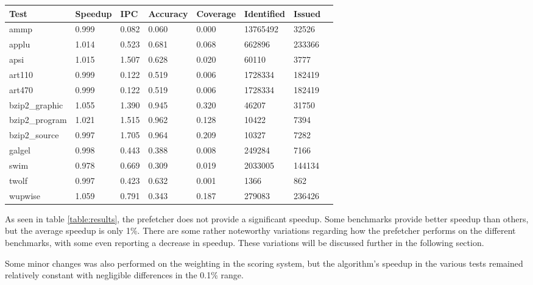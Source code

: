 

\begin{table*}[!t]
\renewcommand{\arraystretch}{1.3}
\caption{Prefetcher results from the Kongull Cluster}
\label{table:results}
\centering
\begin{tabular}{|l|l|l|l|l|l|l|l|}
\hline
\bfseries Test & \bfseries Speedup & \bfseries IPC & \bfseries Accuracy & \bfseries Coverage & \bfseries Identified & \bfseries Issued\\
\hline
\hline
ammp 		& 0.999 & 0.082 & 0.060 & 0.000 & 13765492 & 32526\\
applu 		& 1.014 & 0.523 & 0.681 & 0.068 & 662896   & 233366\\
apsi 		& 1.015 & 1.507 & 0.628 & 0.020 & 60110    & 3777\\	
art110 		& 0.999 & 0.122 & 0.519 & 0.006 & 1728334  & 182419\\	
art470 		& 0.999 & 0.122 & 0.519 & 0.006 & 1728334  & 182419\\
bzip2\_graphic 	& 1.055 & 1.390 & 0.945 & 0.320 & 46207    & 31750\\
bzip2\_program 	& 1.021 & 1.515 & 0.962 & 0.128 & 10422    & 7394\\
bzip2\_source 	& 0.997 & 1.705 & 0.964 & 0.209 & 10327    & 7282\\
galgel 		& 0.998 & 0.443 & 0.388 & 0.008 & 249284   & 7166\\
swim 		& 0.978 & 0.669 & 0.309 & 0.019 & 2033005  & 144134\\
twolf 		& 0.997 & 0.423 & 0.632 & 0.001 & 1366 	   & 862	\\
wupwise 	& 1.059 & 0.791 & 0.343 & 0.187 & 279083   & 236426\\
\hline
\end{tabular}
\end{table*}

As seen in table \ref{table:results}, the prefetcher does not provide a significant speedup. Some benchmarks provide better speedup than others, but the average speedup is only 1\%. There are some rather noteworthy variations regarding how the prefetcher performs on the different benchmarks, with some even reporting a decrease in speedup. These variations will be discussed further in the following section.

Some minor changes was also performed on the weighting in the scoring system, but the algorithm's speedup in the various tests remained relatively constant with negligible differences in the 0.1\% range.

